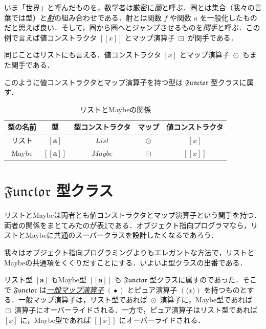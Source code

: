 \documentclass[a4paper]{jsbook}
\def\[{\left[\!\left[}
\def\]{\right]\!\right]}
\newcommand{\keyword}[1]{{\underline{\emph{#1}}}}
\newcommand{\mType}[1]{\mathbf{#1}}
\newcommand{\mListType}[1]{[\mType{#1}]}
\newcommand{\mMaybeType}[1]{\[\mType{#1}\]}
\newcommand{\mTypeConstructor}[1]{\mathit{#1}} %
\newcommand{\mSpecialTypeClass}[1]{\mathfrak{#1}} %
\newcommand{\mFunctorTypeClass}{\mSpecialTypeClass{Functor}}
\newcommand{\mListWith}[1]{\left[#1\right]}
\newcommand{\mMaybeWith}[1]{\[#1\]}
\newcommand{\mPureWith}[1]{\langle#1\rangle}
\DeclareMathOperator{\mMap}{\bullet}
\DeclareMathOperator{\mMapList}{\odot}
\DeclareMathOperator{\mMapMaybe}{\boxdot}
\DeclareMathOperator{\mListTypeConstructor}{\mTypeConstructor{List}}
\DeclareMathOperator{\mMaybeTypeConstructor}{\mTypeConstructor{Maybe}}
\begin{document}
いま「世界」と呼んだものを，数学者は厳密に\keyword{圏}と呼ぶ．圏とは集合（我々の言葉では型）と\keyword{射}の組み合わせである．射とは関数 $f$ や関数 $a$ を一般化したものだと思えば良い．そして，圏から圏へとジャンプさせるものを\keyword{関手}と呼ぶ．この例で言えば値コンストラクタ $\mMaybeWith{x}$ とマップ演算子 $\mMapMaybe$ が関手である．

同じことはリストにも言える．値コンストラクタ $\mListWith{x}$ とマップ演算子 $\mMapList$ もまた関手である．

このように値コンストラクタとマップ演算子を持つ型は $\mFunctorTypeClass$ 型クラスに属す．

\begin{table}
\label{tab:list-and-maybe}
\caption{リストとMaybeの関係}
\begin{center}
\begin{tabular}{||c|c|c|c|c||}\hline
型の名前&型&型コンストラクタ&マップ&値コンストラクタ\\\hline\hline
リスト&$\mListType{a}$&$\mListTypeConstructor$&$\mMapList$&$\mListWith{x}$\\
Maybe&$\mMaybeType{a}$&$\mMaybeTypeConstructor$&$\mMapMaybe$&$\mMaybeWith{x}$\\\hline
\end{tabular}
\end{center}
\end{table}

\section{$\mFunctorTypeClass$ 型クラス}

リストとMaybeは両者とも値コンストラクタとマップ演算子という関手を持つ．両者の関係をまとてみたのが表\ref{tab:list-and-maybe}である．オブジェクト指向プログラマなら，リストとMaybeに共通のスーパークラスを設計したくなるであろう．

我々はオブジェクト指向プログラミングよりもエレガントな方法で，リストとMaybeの共通項をくくりだすことにする．いよいよ型クラスの出番である．

リスト型 $\mListType{a}$ もMaybe型 $\mMaybeType{a}$ も $\mFunctorTypeClass$ 型クラスに属すのであった．そこで $\mFunctorTypeClass$ は\keyword{一般マップ演算子} $(\mMap)$ とピュア演算子 $(\mPureWith{x})$ を持つものとする．一般マップ演算子は，リスト型であれば $\mMapList$ 演算子に，Maybe型であれば $\mMapMaybe$ 演算子にオーバーライドされる．一方で，ピュア演算子はリスト型であれば $\mListWith{x}$ に，Maybe型であれば $\mMaybeWith{x}$ にオーバーライドされる．
\end{document}
